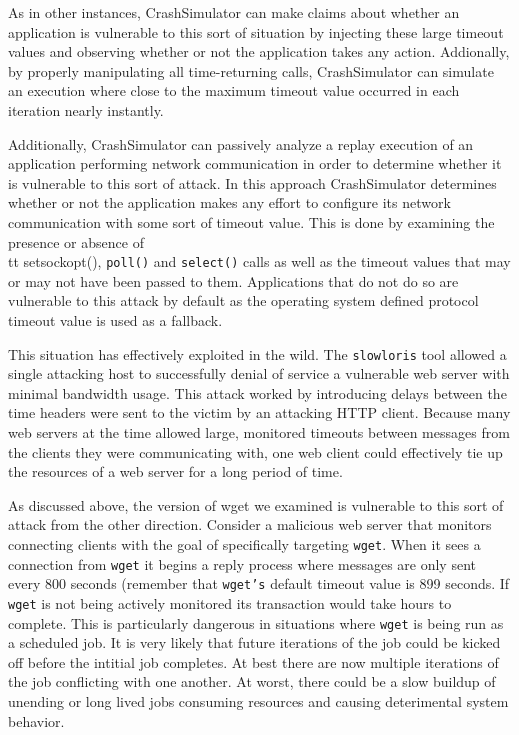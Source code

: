 As in other instances, CrashSimulator can make claims about whether an application is vulnerable to this
sort of situation by injecting these large timeout values and observing whether or not the application takes
any action.  Addionally, by properly manipulating all time-returning calls, CrashSimulator can simulate an
execution where close to the maximum timeout value occurred in each iteration nearly instantly.

Additionally, CrashSimulator can passively analyze a replay execution of an application performing network communication
in order to determine whether it is vulnerable to this sort of attack.  In this approach CrashSimulator determines
whether or not the application makes any effort to configure its network communication with some sort of timeout
value. This is done by examining the presence or absence of {\\tt setsockopt()}, {\tt poll()} and {\tt select()} calls
as well as the timeout values that may or may not have been passed to them. Applications that do not do so are
vulnerable to this attack by default as the operating system defined protocol timeout
value is used as a fallback.

This situation has effectively exploited in the wild.  The {\tt slowloris} tool allowed a single attacking
host to successfully denial of service a vulnerable web server with minimal bandwidth usage.  This attack
worked by introducing delays between the time headers were sent to the victim by an attacking HTTP client.
Because many web servers at the time allowed large, monitored timeouts between messages from the clients
they were communicating with, one web client could effectively tie up the resources of a web server for a
long period of time.

As discussed above, the version of wget we examined is vulnerable to this sort of attack from the other
direction.  Consider a malicious web server that monitors connecting clients with the goal of specifically
targeting {\tt wget}.  When it sees a connection from {\tt wget} it begins a reply process where messages
are only sent every 800 seconds (remember that {\tt wget's} default timeout value is 899 seconds.  If {\tt
  wget} is not being actively monitored its transaction would take hours to complete.  This is particularly
dangerous in situations where {\tt wget} is being run as a scheduled job.  It is very likely that future
iterations of the job could be kicked off before the intitial job completes.  At best there are now multiple
iterations of the job conflicting with one another.  At worst, there could be a slow buildup of unending or
long lived jobs consuming resources and causing deterimental system behavior.

